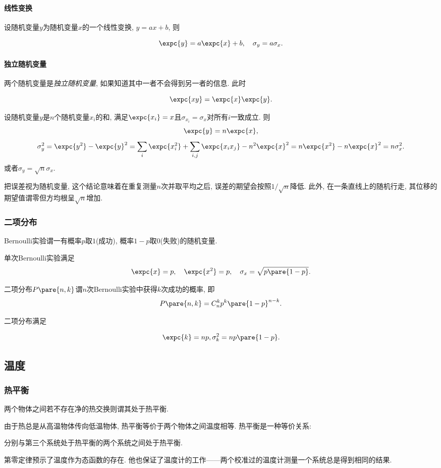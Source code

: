 \documentclass[../Thermal.tex]{subfiles}
\begin{document}
\paragraph{线性变换}设随机变量$y$为随机变量$x$的一个线性变换, $y=ax+b$, 则
\begin{finale}
\[ \expc{y} = a\expc{x} + b, \quad \sigma_y = a\sigma_x. \]
\end{finale}
\paragraph{独立随机变量}两个随机变量是\emph{独立随机变量}, 如果知道其中一者不会得到另一者的信息. 此时
\begin{finale}
\[ \expc{xy} = \expc{x}\expc{y}. \]
\end{finale}
\begin{ex}
设随机变量$y$是$n$个随机变量$x_i$的和, 满足$\expc{x_i} = x$且$\sigma_{x_i} = \sigma_x$对所有$i$一致成立. 则
\[ \expc{y} = n\expc{x}, \]
\[ \sigma_y^2 = \expc{y^2} - \expc{y}^2 = \sum_i\expc{x_i^2} + \sum_{i,j}\expc{x_ix_j} - n^2\expc{x}^2 = n\expc{x^2} - n\expc{x}^2 = n\sigma_x^2. \]
或者$\sigma_y = \sqrt{n}\sigma_x$.
\end{ex}
把误差视为随机变量, 这个结论意味着在重复测量$n$次并取平均之后, 误差的期望会按照$1/\sqrt{n}$降低. 此外, 在一条直线上的随机行走, 其位移的期望值谓零但方均根呈$\sqrt{n}$增加.
\subsubsection{二项分布}
\begin{theorem}[Bernoulli实验]
Bernoulli实验谓一有概率$p$取$1$(成功), 概率$1-p$取$0$(失败)的随机变量.
\end{theorem}
单次Bernoulli实验满足
\[ \expc{x} = p,\quad \expc{x^2} = p,\quad \sigma_x = \sqrt{p\pare{1-p}}. \]
\begin{definition}
二项分布$P\pare{n,k}$谓$n$次Bernoulli实验中获得$k$次成功的概率, 即
\[ P\pare{n,k} = C_n^kp^k\pare{1-p}^{n-k}. \]
\end{definition}
二项分布满足
\begin{finale}
\[ \expc{k} = np, \sigma_k^2 = np\pare{1-p}. \]
\end{finale}
\subsection{温度}
\subsubsection{热平衡}
\begin{definition}[热平衡]
两个物体之间若不存在净的热交换则谓其处于热平衡.
\end{definition}
由于热总是从高温物体传向低温物体, 热平衡等价于两个物体之间温度相等. 热平衡是一种等价关系:
\begin{finale}
\begin{axiom}[热力学第零定律]
分别与第三个系统处于热平衡的两个系统之间处于热平衡.
\end{axiom}
\end{finale}
第零定律预示了温度作为态函数的存在\cite{ZhangYuMin}. 他也保证了温度计的工作——两个校准过的温度计测量一个系统总是得到相同的结果.
\end{document}
